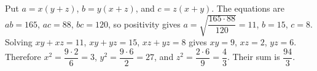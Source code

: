 Put $a=x(y+z)$, $b=y(x+z)$, and $c=z(x+y)$. The equations are $ab=165$, $ac=88$, $bc=120$, so positivity gives $a=\sqrt{\dfrac{165\cdot88}{120}}=11$, $b=15$, $c=8$. Solving $xy+xz=11$, $xy+yz=15$, $xz+yz=8$ gives $xy=9$, $xz=2$, $yz=6$. Therefore $x^2=\dfrac{9\cdot2}{6}=3$, $y^2=\dfrac{9\cdot6}{2}=27$, and $z^2=\dfrac{2\cdot6}{9}=\dfrac{4}{3}$. Their sum is $\boxed{\dfrac{94}{3}}$.
